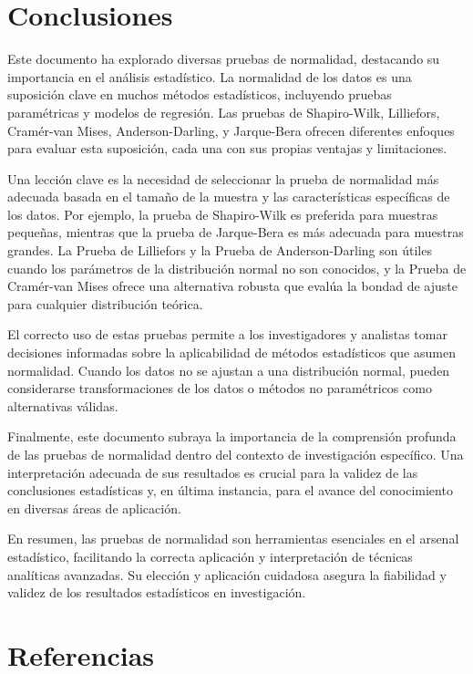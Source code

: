 \documentclass{article}
\begin{document}
\section{Conclusiones}

Este documento ha explorado diversas pruebas de normalidad, destacando su importancia en el análisis estadístico. La normalidad de los datos es una suposición clave en muchos métodos estadísticos, incluyendo pruebas paramétricas y modelos de regresión. Las pruebas de Shapiro-Wilk, Lilliefors, Cramér-van Mises, Anderson-Darling, y Jarque-Bera ofrecen diferentes enfoques para evaluar esta suposición, cada una con sus propias ventajas y limitaciones.

Una lección clave es la necesidad de seleccionar la prueba de normalidad más adecuada basada en el tamaño de la muestra y las características específicas de los datos. Por ejemplo, la prueba de Shapiro-Wilk es preferida para muestras pequeñas, mientras que la prueba de Jarque-Bera es más adecuada para muestras grandes. La Prueba de Lilliefors y la Prueba de Anderson-Darling son útiles cuando los parámetros de la distribución normal no son conocidos, y la Prueba de Cramér-van Mises ofrece una alternativa robusta que evalúa la bondad de ajuste para cualquier distribución teórica.

El correcto uso de estas pruebas permite a los investigadores y analistas tomar decisiones informadas sobre la aplicabilidad de métodos estadísticos que asumen normalidad. Cuando los datos no se ajustan a una distribución normal, pueden considerarse transformaciones de los datos o métodos no paramétricos como alternativas válidas.

Finalmente, este documento subraya la importancia de la comprensión profunda de las pruebas de normalidad dentro del contexto de investigación específico. Una interpretación adecuada de sus resultados es crucial para la validez de las conclusiones estadísticas y, en última instancia, para el avance del conocimiento en diversas áreas de aplicación.

En resumen, las pruebas de normalidad son herramientas esenciales en el arsenal estadístico, facilitando la correcta aplicación y interpretación de técnicas analíticas avanzadas. Su elección y aplicación cuidadosa asegura la fiabilidad y validez de los resultados estadísticos en investigación.

\section{Referencias}
\end{document}
